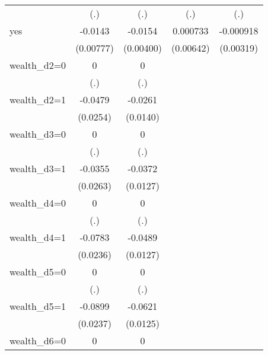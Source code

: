 \begin{table}[htbp]
\begin{tabular}{l*{4}{c}}
                &      (.)         &      (.)         &      (.)         &      (.)         \\
yes             &  -0.0143\sym{*}  &  -0.0154\sym{***}& 0.000733         &-0.000918         \\
                &(0.00777)         &(0.00400)         &(0.00642)         &(0.00319)         \\
wealth\_d2=0     &        0         &        0         &                  &                  \\
                &      (.)         &      (.)         &                  &                  \\
wealth\_d2=1     &  -0.0479\sym{*}  &  -0.0261\sym{*}  &                  &                  \\
                & (0.0254)         & (0.0140)         &                  &                  \\
wealth\_d3=0     &        0         &        0         &                  &                  \\
                &      (.)         &      (.)         &                  &                  \\
wealth\_d3=1     &  -0.0355         &  -0.0372\sym{***}&                  &                  \\
                & (0.0263)         & (0.0127)         &                  &                  \\
wealth\_d4=0     &        0         &        0         &                  &                  \\
                &      (.)         &      (.)         &                  &                  \\
wealth\_d4=1     &  -0.0783\sym{***}&  -0.0489\sym{***}&                  &                  \\
                & (0.0236)         & (0.0127)         &                  &                  \\
wealth\_d5=0     &        0         &        0         &                  &                  \\
                &      (.)         &      (.)         &                  &                  \\
wealth\_d5=1     &  -0.0899\sym{***}&  -0.0621\sym{***}&                  &                  \\
                & (0.0237)         & (0.0125)         &                  &                  \\
wealth\_d6=0     &        0         &        0         &                  &                  \\

\end{tabular}
\end{table}
